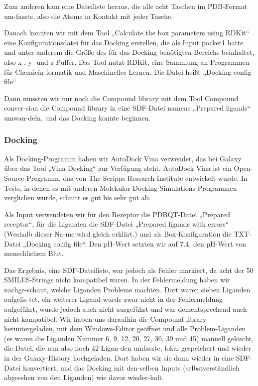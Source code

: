 \documentclass[11pt]{article}
\begin{document}

    Zum anderen kam eine Dateiliste heraus, die alle acht Taschen im PDB-Format um-fasste, also die Atome in Kontakt mit jeder Tasche.

    Danach konnten wir mit dem Tool „Calculate the box parameters using RDKit“ eine Konfigurationsdatei für das Docking erstellen, die als Input pocket1 hatte und unter anderem die Größe des für das Docking benötigten Bereichs beinhaltet, also x-, y- und z-Puffer.
    Das Tool nutzt RDKit, eine Sammlung an Programmen für Chemiein-formatik und Maschinelles Lernen.
    Die Datei heißt „Docking config file“

    Dann mussten wir nur noch die Compound library mit dem Tool Compound conver-sion die Compound library in eine SDF-Datei namens „Prepared ligands“ umwan-deln, und das Docking konnte beginnen.


    \subsubsection{Docking}\label{subsubsec:docking}

    Als Docking-Programm haben wir AutoDock Vina verwendet, das bei Galaxy über das Tool „Vina Docking“ zur Verfügung steht.
    AutoDock Vina ist ein Open-Source-Programm, das von The Scripps Research Institute entwickelt wurde.
    In Tests, in denen es mit anderen Molekular-Docking-Simulations-Programmen verglichen wurde, schnitt es gut bis sehr gut ab.


    Als Input verwendeten wir für den Rezeptor die PDBQT-Datei „Prepared receptor“, für die Liganden die SDF-Datei „Prepared ligands with errors“ (Weshalb dieser Na-me wird gleich erklärt.) und als Box-Konfiguration die TXT-Datei „Docking config file“.
    Den pH-Wert setzten wir auf 7.4, den pH-Wert von menschlichem Blut.

    Das Ergebnis, eine SDF-Dateiliste, war jedoch als Fehler markiert, da acht der 50 SMILES-Strings nicht kompatibel waren.
    In der Fehlermeldung haben wir nachge-schaut, welche Liganden Probleme machten.
    Dort waren sieben Liganden aufgelis-tet, ein weiterer Ligand wurde zwar nicht in der Fehlermeldung aufgeführt, wurde jedoch auch nicht ausgeführt und war dementsprechend auch nicht kompatibel.
    Wir haben uns daraufhin die Compound library heruntergeladen, mit dem Windows-Editor geöffnet und alle Problem-Liganden (es waren die Liganden Nummer 6, 9, 12, 20, 27, 30, 39 und 45) manuell gelöscht, die Datei, die nun also noch 42 Ligan-den umfasste, lokal gespeichert und wieder in der Galaxy-History hochgeladen.
    Dort haben wir sie dann wieder in eine SDF-Datei konvertiert, und das Docking mit den-selben Inputs (selbstverständlich abgesehen von den Liganden) wie davor wieder-holt.
\end{document}
